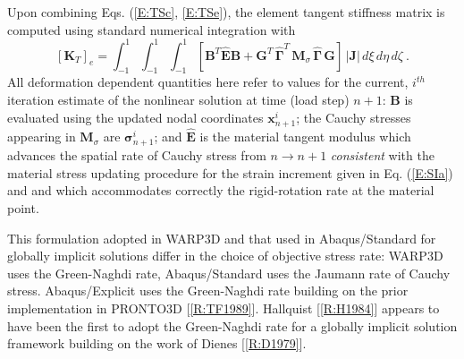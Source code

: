 \documentclass[11pt]{report}
\numberwithin{equation}{section}
\newcommand{\bmf } {\boldsymbol }  %
\newcommand{\ti}{\emph}
\newcommand{\nid}{\noindent}
\begin{document}
Upon combining Eqs. (\ref{E:TSc}, \ref{E:TSe}), the element tangent stiffness matrix is computed using
standard numerical integration with
%
\begin{equation}\label{E:TSg}
 \left [ \mathbf{K}_T \right ]_e= \int_{-1}^{1} \int_{-1}^{1} \int_{-1}^{1} 
 \left [ \mathbf{B}^T \hat{\mathbf{E}} \mathbf{B} +
  \mathbf{G}^T \,\hat{\bmf{\Gamma}}^T\,\mathbf{M}_{\sigma}\,\hat{\bmf{\Gamma}} \,\mathbf{G} \right]
    \, |\mathbf{J}| \, d\xi\, d\eta \,d\zeta \ .
\end{equation}
%
\nid All deformation dependent quantities here refer to values for the current, $i^{th}$ iteration estimate of the 
nonlinear solution at time (load step) $n+1$: $\mathbf{B}$ is evaluated using the updated nodal coordinates
$\bmf{x}_{n+1}^i$; the Cauchy stresses appearing in $\mathbf{M}_{\sigma}$ are $\bmf{\sigma}_{n+1}^i$;
and $\hat{\mathbf{E}}$ is the material tangent modulus which advances the spatial rate of Cauchy stress
from $n\rightarrow n+1$ \ti{consistent} with the material stress updating procedure for the strain
increment given in Eq. (\ref{E:SIa}) and and which accommodates correctly the rigid-rotation rate at the material
point.

This formulation adopted in WARP3D and that used in Abaqus/Standard for globally 
implicit solutions differ in the choice of objective stress
rate: WARP3D uses the Green-Naghdi rate, Abaqus/Standard uses the Jaumann rate of Cauchy stress.
Abaqus/Explicit uses the Green-Naghdi
rate building on the prior implementation in PRONTO3D [\ref{R:TF1989}]. Hallquist [\ref{R:H1984}] 
appears to have been the first to adopt the 
Green-Naghdi rate for a globally implicit solution framework building on the work of Dienes [\ref{R:D1979}].
\end{document}
